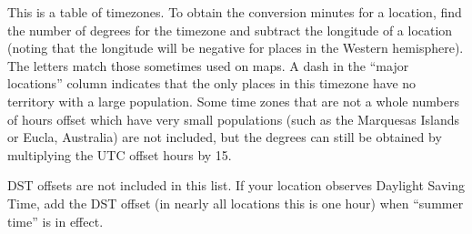 This is a table of timezones. To obtain the conversion minutes for a location, find the number of degrees for the timezone and subtract the longitude of a location (noting that the longitude will be negative for places in the Western hemisphere). The letters match those sometimes used on maps. A dash in the ``major locations'' column indicates that the only places in this timezone have no territory with a large population. Some time zones that are not a whole numbers of hours offset which have very small populations (such as the Marquesas Islands or Eucla, Australia) are not included, but the degrees can still be obtained by multiplying the UTC offset hours by 15.

DST offsets are not included in this list.  If your location observes Daylight Saving Time, add the DST offset (in nearly all locations this is one hour) when ``summer time'' is in effect.

